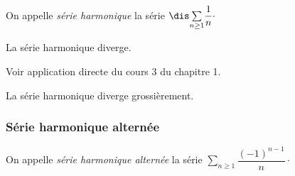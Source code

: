 \documentclass[french,11pt,twoside]{VcCours}
\newcommand{\Sum}[2]{\ensuremath{\textstyle{\sum\limits_{#1}^{#2}}}}
\begin{document}
On appelle \textit{série harmonique} la série $\dis \Sum{n \geq 1}{} \dfrac{1}{n} \cdot$

\begin{thm} La série harmonique diverge.
\end{thm}

\begin{preuve} Voir application directe du cours 3 du chapitre 1.
%
\end{preuve}

\begin{rem} La série harmonique diverge grossièrement.
\end{rem}

\subsubsection{Série harmonique alternée}

On appelle \textit{série harmonique alternée} la série $ \Sum{n \geq 1}{} \dfrac{(-1)^{n-1}}{n} \cdot$

\medskip
\end{document}
